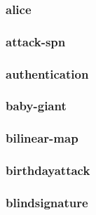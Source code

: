 \begin{frame} \frametitle{alice}
\begin{figure}
\begin{center}

\end{center}
\end{figure}
\end{frame}
\begin{frame} \frametitle{attack-spn}
\begin{figure}
\begin{center}

\end{center}
\end{figure}
\end{frame}
\begin{frame} \frametitle{authentication}
\begin{figure}
\begin{center}

\end{center}
\end{figure}
\end{frame}
\begin{frame} \frametitle{baby-giant}
\begin{figure}
\begin{center}

\end{center}
\end{figure}
\end{frame}
\begin{frame} \frametitle{bilinear-map}
\begin{figure}
\begin{center}

\end{center}
\end{figure}
\end{frame}
\begin{frame} \frametitle{birthdayattack}
\begin{figure}
\begin{center}

\end{center}
\end{figure}
\end{frame}
\begin{frame} \frametitle{blindsignature}
\begin{figure}
\begin{center}

\end{center}
\end{figure}
\end{frame}
